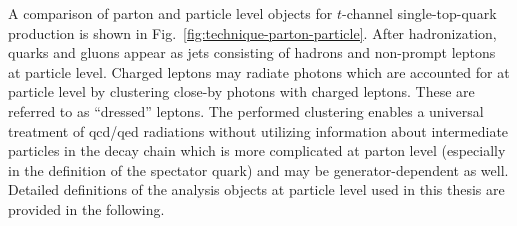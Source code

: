 A comparison of parton and particle level objects for $t$-channel single-top-quark production is shown in Fig.~\ref{fig:technique-parton-particle}. After hadronization, quarks and gluons appear as jets consisting of hadrons and non-prompt leptons at particle level. Charged leptons may radiate photons which are accounted for at particle level by clustering close-by photons with charged leptons. These are referred to as ``dressed'' leptons. The performed clustering enables a universal treatment of \gls{qcd}/\gls{qed} radiations without utilizing information about intermediate particles in the decay chain which is more complicated at parton level (especially in the definition of the spectator quark) and may be generator-dependent as well. Detailed definitions of the analysis objects at particle level used in this thesis are provided in the following.



